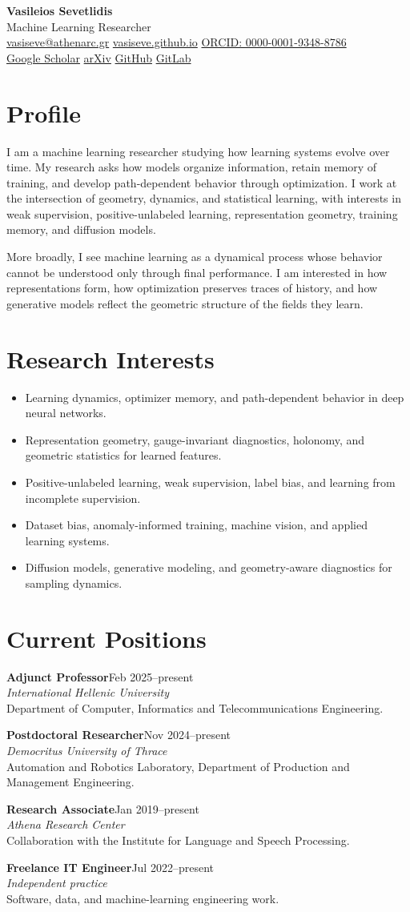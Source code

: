 \documentclass[11pt,a4paper]{article}
\newcommand{\cvsection}[1]{\section*{#1}}
\newcommand{\role}[4]{%
  \textbf{#2}\hfill{\color{muted}#1}\\
  \textit{#3}\\
  #4\par\vspace{3pt}
}
\begin{document}
{\Huge\bfseries Vasileios Sevetlidis}\\[3pt]
{\Large Machine Learning Researcher}\\[8pt]
\href{mailto:vasiseve@athenarc.gr}{vasiseve@athenarc.gr} \quad
\href{https://vasiseve.github.io}{vasiseve.github.io} \quad
\href{https://orcid.org/0000-0001-9348-8786}{ORCID: 0000-0001-9348-8786}\\
\href{https://scholar.google.com/citations?user=8RIQDfoAAAAJ&hl=en}{Google Scholar} \quad
\href{https://arxiv.org/search/cs?searchtype=author&query=Sevetlidis,+V}{arXiv} \quad
\href{https://github.com/vasiseve}{GitHub} \quad
\href{https://gitlab.com/vasiseve}{GitLab}

\vspace{8pt}

\cvsection{Profile}
I am a machine learning researcher studying how learning systems evolve over time. My research asks how models organize information, retain memory of training, and develop path-dependent behavior through optimization. I work at the intersection of geometry, dynamics, and statistical learning, with interests in weak supervision, positive-unlabeled learning, representation geometry, training memory, and diffusion models.

More broadly, I see machine learning as a dynamical process whose behavior cannot be understood only through final performance. I am interested in how representations form, how optimization preserves traces of history, and how generative models reflect the geometric structure of the fields they learn.

\cvsection{Research Interests}
\begin{itemize}
  \item Learning dynamics, optimizer memory, and path-dependent behavior in deep neural networks.
  \item Representation geometry, gauge-invariant diagnostics, holonomy, and geometric statistics for learned features.
  \item Positive-unlabeled learning, weak supervision, label bias, and learning from incomplete supervision.
  \item Dataset bias, anomaly-informed training, machine vision, and applied learning systems.
  \item Diffusion models, generative modeling, and geometry-aware diagnostics for sampling dynamics.
\end{itemize}

\cvsection{Current Positions}
\role{Feb 2025--present}{Adjunct Professor}{International Hellenic University}{Department of Computer, Informatics and Telecommunications Engineering.}
\role{Nov 2024--present}{Postdoctoral Researcher}{Democritus University of Thrace}{Automation and Robotics Laboratory, Department of Production and Management Engineering.}
\role{Jan 2019--present}{Research Associate}{Athena Research Center}{Collaboration with the Institute for Language and Speech Processing.}
\role{Jul 2022--present}{Freelance IT Engineer}{Independent practice}{Software, data, and machine-learning engineering work.}
\end{document}
